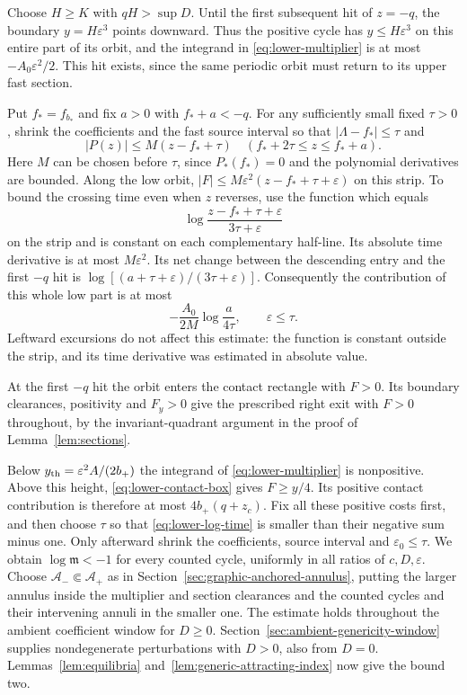 Choose $H\ge K$ with $qH>\sup D$. Until the first subsequent hit of
$z=-q$, the boundary $y=H\varepsilon^3$ points downward. Thus the
positive cycle has $y\le H\varepsilon^3$ on this entire part of its
orbit, and the integrand in \eqref{eq:lower-multiplier} is at most
$-A_0\varepsilon^2/2$. This hit exists, since the same periodic orbit
must return to its upper fast section.

Put $f_*=f_{b_*}$ and fix $a>0$ with $f_*+a<-q$. For any sufficiently
small fixed $\tau>0$, shrink the coefficients and the fast source interval
so that $|\Lambda-f_*|\le\tau$ and
\[
 |P(z)|\le M(z-f_*+\tau)
       \quad(f_*+2\tau\le z\le f_*+a).
\]
Here $M$ can be chosen before $\tau$, since $P_*(f_*)=0$ and the
polynomial derivatives are bounded. Along the low orbit,
$|F|\le M\varepsilon^2(z-f_*+\tau+\varepsilon)$ on this strip.
To bound the crossing time even when $z$ reverses, use the function which equals
\[
 \log\frac{z-f_*+\tau+\varepsilon}{3\tau+\varepsilon}
\]
on the strip and is constant on each complementary half-line. Its
absolute time derivative is at most $M\varepsilon^2$. Its net change
between the descending entry and the first $-q$ hit is
$\log[(a+\tau+\varepsilon)/(3\tau+\varepsilon)]$. Consequently the
contribution of this whole low part is at most
\begin{equation}\label{eq:lower-log-time}
 -\frac{A_0}{2M}\log\frac{a}{4\tau},\qquad
 \varepsilon\le\tau.
\end{equation}
Leftward excursions do not affect this estimate: the function is constant
outside the strip, and its time derivative was estimated in absolute value.

At the first $-q$ hit the orbit enters the contact rectangle with
$F>0$. Its boundary clearances, positivity and $F_y>0$ give the
prescribed right exit with $F>0$ throughout, by the invariant-quadrant
argument in the proof of Lemma~\ref{lem:sections}.

Below $y_{\rm th}=\varepsilon^2A/(2b_+)$ the integrand of
\eqref{eq:lower-multiplier} is nonpositive. Above this height,
\eqref{eq:lower-contact-box} gives $F\ge y/4$. Its positive contact
contribution is therefore at most $4b_+(q+z_c)$. Fix all these positive
costs first, and then choose $\tau$ so that
\eqref{eq:lower-log-time} is smaller than their negative sum minus one.
Only afterward shrink the coefficients, source interval and
$\varepsilon_0\le\tau$. We obtain $\log\mathfrak m<-1$ for every
counted cycle, uniformly in all ratios of $c,D,\varepsilon$.
Choose $\mathcal A_-\Subset\mathcal A_+$ as in
Section~\ref{sec:graphic-anchored-annulus}, putting the larger annulus
inside the multiplier and section clearances and the counted cycles
and their intervening annuli in the smaller one. The estimate holds
throughout the ambient coefficient window for $D\ge0$.
Section~\ref{sec:ambient-genericity-window} supplies nondegenerate
perturbations with $D>0$, also from $D=0$. Lemmas~\ref{lem:equilibria}
and~\ref{lem:generic-attracting-index} now give the bound two.

